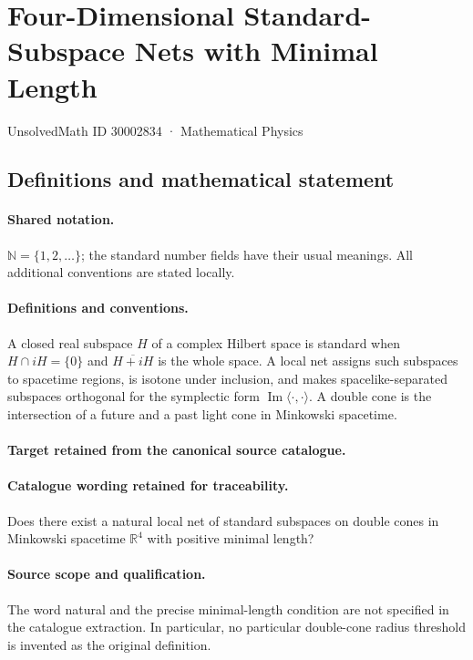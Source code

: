 \documentclass[11pt]{article}
\begin{document}
\setcounter{section}{30002833}
\section{Four-Dimensional Standard-Subspace Nets with Minimal Length}\label{30002834}
{\small UnsolvedMath ID 30002834 · Mathematical Physics}
\subsection{Definitions and mathematical statement}

\paragraph{Shared notation.}$\mathbb N=\{1,2,\ldots\}$; the standard number fields have their usual meanings. All additional conventions are stated locally.


\paragraph{Definitions and conventions.}
A closed real subspace $H$ of a complex Hilbert space is standard when $H\cap iH=\{0\}$ and $\overline{H+iH}$ is the whole space. A local net assigns such subspaces to spacetime regions, is isotone under inclusion, and makes spacelike-separated subspaces orthogonal for the symplectic form $\operatorname{Im}\langle\cdot,\cdot\rangle$. A double cone is the intersection of a future and a past light cone in Minkowski spacetime.

\paragraph{Target retained from the canonical source catalogue.}
\paragraph{Catalogue wording retained for traceability.}
Does there exist a natural local net of standard subspaces on double cones in Minkowski spacetime $\mathbb R^4$ with positive minimal length?

\paragraph{Source scope and qualification.}
The word natural and the precise minimal-length condition are not specified in the catalogue extraction. In particular, no particular double-cone radius threshold is invented as the original definition.
\end{document}
